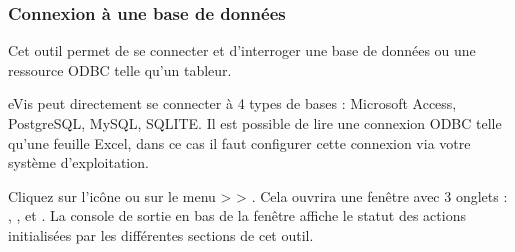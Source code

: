 \subsubsection{Connexion à une base de données}\label{evis_database}


Cet outil permet de se connecter et d'interroger une base de données ou une ressource ODBC telle qu'un tableur.


eVis peut directement se connecter à 4 types de bases : Microsoft Access, PostgreSQL, MySQL, SQLITE. Il est possible de lire une connexion ODBC telle qu'une feuille Excel, dans ce cas il faut configurer cette connexion via votre système d'exploitation.

\label{evis_launch_database}


Cliquez sur l'icône  ou sur le menu  >  > . Cela ouvrira une fenêtre avec 3 onglets : , , et . La console de sortie en bas de la fenêtre affiche le statut des actions initialisées par les différentes sections de cet outil.

